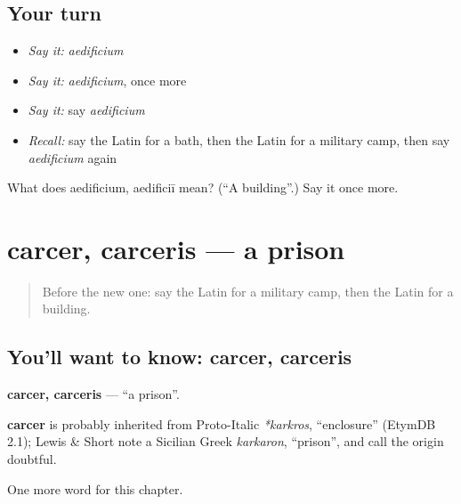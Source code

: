 \subsection*{Your turn}
\begin{itemize}
\raggedright
  \item \emph{Say it:} \emph{aedificium}
  \item \emph{Say it:} \emph{aedificium}, once more
  \item \emph{Say it:} say \emph{aedificium}
  \item \emph{Recall:} say the Latin for a bath, then the Latin for a military camp, then say \emph{aedificium} again
\end{itemize}

\begin{tcolorbox}[breakable,colback=teal!4,colframe=teal!35!black,title={Before you move on}]
What does aedificium, aedificiī mean? (\textquotedblleft{}A building\textquotedblright{}.) Say it once more.
\end{tcolorbox}
\section[carcer, carceris]{carcer, carceris — a prison}

\label{lesson:LA-C116-carcer}



\begin{quote}
Before the new one: say the Latin for a military camp, then the Latin for a building.
\end{quote}

\subsection*{You'll want to know: carcer, carceris}
\textbf{carcer, carceris} — \textquotedblleft{}a prison\textquotedblright{}.

\begin{cousinweb}
\textbf{carcer} is probably inherited from Proto-Italic \emph{*karkros}, \textquotedblleft{}enclosure\textquotedblright{} (EtymDB 2.1); Lewis \& Short note a Sicilian Greek \emph{karkaron}, \textquotedblleft{}prison\textquotedblright{}, and call the origin doubtful.
\end{cousinweb}

\begin{grammarlens}[title={What you've built}]
One more word for this chapter.
\end{grammarlens}

